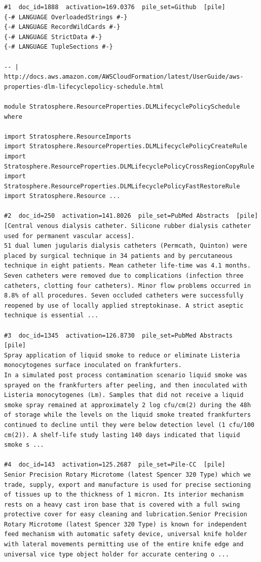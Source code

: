 \begin{verbatim}
#1  doc_id=1888  activation=169.0376  pile_set=Github  [pile]
{-# LANGUAGE OverloadedStrings #-}
{-# LANGUAGE RecordWildCards #-}
{-# LANGUAGE StrictData #-}
{-# LANGUAGE TupleSections #-}

-- | http://docs.aws.amazon.com/AWSCloudFormation/latest/UserGuide/aws-properties-dlm-lifecyclepolicy-schedule.html

module Stratosphere.ResourceProperties.DLMLifecyclePolicySchedule where

import Stratosphere.ResourceImports
import Stratosphere.ResourceProperties.DLMLifecyclePolicyCreateRule
import Stratosphere.ResourceProperties.DLMLifecyclePolicyCrossRegionCopyRule
import Stratosphere.ResourceProperties.DLMLifecyclePolicyFastRestoreRule
import Stratosphere.Resource ...

#2  doc_id=250  activation=141.8026  pile_set=PubMed Abstracts  [pile]
[Central venous dialysis catheter. Silicone rubber dialysis catheter used for permanent vascular access].
51 dual lumen jugularis dialysis catheters (Permcath, Quinton) were placed by surgical technique in 34 patients and by percutaneous technique in eight patients. Mean catheter life-time was 4.1 months. Seven catheters were removed due to complications (infection three catheters, clotting four catheters). Minor flow problems occurred in 8.8% of all procedures. Seven occluded catheters were successfully reopened by use of locally applied streptokinase. A strict aseptic technique is essential ...

#3  doc_id=1345  activation=126.8730  pile_set=PubMed Abstracts  [pile]
Spray application of liquid smoke to reduce or eliminate Listeria monocytogenes surface inoculated on frankfurters.
In a simulated post process contamination scenario liquid smoke was sprayed on the frankfurters after peeling, and then inoculated with Listeria monocytogenes (Lm). Samples that did not receive a liquid smoke spray remained at approximately 2 log cfu/cm(2) during the 48h of storage while the levels on the liquid smoke treated frankfurters continued to decline until they were below detection level (1 cfu/100 cm(2)). A shelf-life study lasting 140 days indicated that liquid smoke s ...

#4  doc_id=143  activation=125.2687  pile_set=Pile-CC  [pile]
Senior Precision Rotary Microtome (latest Spencer 320 Type) which we trade, supply, export and manufacture is used for precise sectioning of tissues up to the thickness of 1 micron. Its interior mechanism rests on a heavy cast iron base that is covered with a full swing protective cover for easy cleaning and lubrication.Senior Precision Rotary Microtome (latest Spencer 320 Type) is known for independent feed mechanism with automatic safety device, universal knife holder with lateral movements permitting use of the entire knife edge and universal vice type object holder for accurate centering o ...


\end{verbatim}
